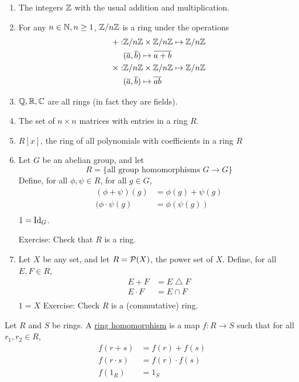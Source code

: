 \documentclass[x11names,reqno,14pt]{extarticle}
\begin{document}
\begin{enumerate}
\item The integers $\mathbb{Z}$ with the usual addition and multiplication.
 
\item For any $n \in \mathbb{N}, n \geq 1$, $\mathbb{Z}/n\mathbb{Z}$ is a ring under the operations 
\begin{align*}
+:& \mathbb{Z}/n\mathbb{Z}\times\mathbb{Z}/n\mathbb{Z} \mapsto\mathbb{Z}/n\mathbb{Z} \\
& (\overline{a}, \overline{b})\mapsto\overline{a + b} \\
\times:&\mathbb{Z}/n\mathbb{Z}\times\mathbb{Z}/n\mathbb{Z}\mapsto\mathbb{Z}/n\mathbb{Z} \\
& (\overline{a}, \overline{b}) \mapsto\overline{ab} \\
\end{align*}

\item $\mathbb{Q}, \mathbb{R}, \mathbb{C}$ are all rings (in fact they are fields). 

\item The set of $n\times n$ matrices with entries in a ring $R$. 

\item $R[x]$, the ring of all polynomials with coefficients in a ring $R$ 
\item Let $G$ be an abelian group, and let 
\[
R = \{\text{all group homomorphisms }G\to G\}
\]
Define, for all $\phi,\psi\in R$, for all $g \in G$, 
\begin{align*}
(\phi + \psi)(g) & = \phi(g) + \psi(g) \\
(\phi\cdot\psi(g) & = \phi(\psi(g)) \\
\end{align*}
$1 = \operatorname{\mathrm{Id}}_G$. 

Exercise: Check that $R$ is a ring. 

\item Let $X$ be any set, and let $R = \mathcal{P}(X)$, the power set of $X$. Define, for all $E, F \in R$, 
\begin{align*}
E + F & = E\bigtriangleup F \\
E \cdot F & = E \cap F \\
\end{align*}
$1 = X$
Exercise: Check $R$ is a (commutative) ring.

\end{enumerate}


Let $R$ and $S$ be rings. A \underline{ring homomorphism} is a map $f:R\to S$ such that for all $r_1, r_2 \in R$, 
\begin{align*}
f(r + s) & = f(r) + f(s) \\
f(r\cdot s) & = f(r)\cdot f(s) \\
f(1_R) & = 1_S \\
\end{align*}
\end{document}
